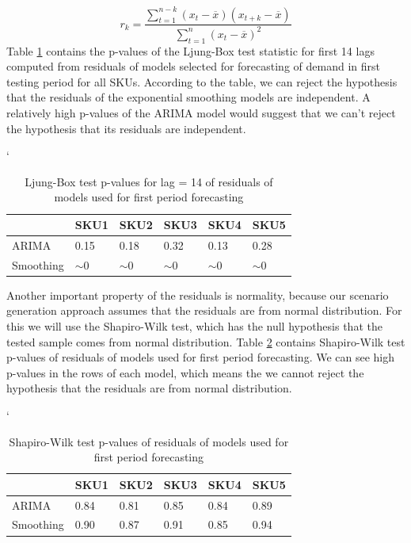\documentclass[11pt,a4paper]{article}
\begin{document}
\begin{equation}
r_k = \frac{\sum\limits_{t=1}^{n-k} (x_t - \overline{x}) (x_{t+k} - \overline{x})}{{\sum\limits_{t=1}^{n}}{ (x_t - \overline{x})^2 }}
\end{equation}
Table \ref{tbl:boxtest} contains the p-values of the Ljung-Box test statistic for first 14 lags computed from residuals of models selected for forecasting of demand in first testing period for all SKUs. According to the table, we can reject the hypothesis that the residuals of the exponential smoothing models are independent. A relatively high p-values of the ARIMA model would suggest that we can't reject the hypothesis that its residuals are independent.



\begin{table} \catcode`
\centering
\begin{tabular}{|l|l|l|l|l|l|}
\hline
& SKU1 & SKU2 & SKU3 & SKU4 & SKU5  \\ \hline 
ARIMA & 0.15 & 0.18 & 0.32 & 0.13 & 0.28 \\ \hline
Smoothing & $\sim 0$ & $\sim 0$ &$\sim 0$ & $\sim 0$& $\sim 0$ \\ \hline
\end{tabular}
\caption{Ljung-Box test p-values for lag = 14 of residuals of models used for first period forecasting}
\label{tbl:boxtest}
\end{table}
\newpage

Another important property of the residuals is normality, because our scenario generation approach assumes that the residuals are from normal distribution. For this we will use the Shapiro-Wilk test, which has the null hypothesis that the tested sample comes from normal distribution.
Table \ref{tbl:shapiro_test} contains Shapiro-Wilk test p-values of residuals of models used for first period forecasting. We can see high p-values in the rows of each model, which means the we cannot reject the hypothesis that the residuals are from normal distribution.

\begin{table} \catcode`
\centering
\begin{tabular}{|l|l|l|l|l|l|}
\hline
& SKU1 & SKU2 & SKU3 & SKU4 & SKU5  \\ \hline 
ARIMA & 0.84 & 0.81 & 0.85 & 0.84 & 0.89 \\ \hline 
Smoothing & 0.90 & 0.87 & 0.91 & 0.85 & 0.94 \\ \hline 

\end{tabular}
\caption{Shapiro-Wilk test p-values of residuals of models used for first period forecasting}
\label{tbl:shapiro_test}
\end{table}
\newpage
\end{document}
